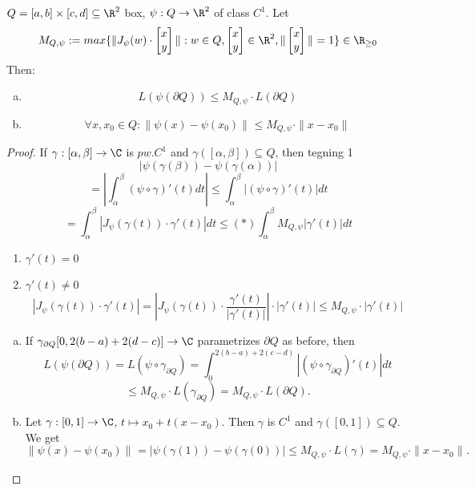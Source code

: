 \begin{lemma}
  $Q=[a,b]\times [c,d]\subseteq \R^2$ box, $\psi:Q\to\R^2$ of class $C^1$. Let
  $$M_{Q,\psi}:=max\{ \| J_{\psi}(w) \cdot
\begin{bmatrix}
  x\\
  y
\end{bmatrix}
  \|_{} : w\in Q,
  \begin{bmatrix}
    x\\
    y
  \end{bmatrix}\in \R^2
  , \| \begin{bmatrix}
    x\\
    y
  \end{bmatrix} \|_{} = 1\}\in \R_{\geq0}
    $$
    Then:
    \begin{enumerate}[(a)]
      \item
        $$L(\psi(\partial Q))\leq M_{Q,\psi} \cdot L(\partial Q)$$
      \item
        $$\forall x,x_0 \in Q : \| \psi(x)-\psi(x_0) \|_{}\leq M_{Q,\psi} \cdot \| x-x_0 \|_{} $$
    \end{enumerate}
\end{lemma}
\begin{proof}
  If $\gamma:[\alpha,\beta]\to \C$ is $pw.C^1$ and $\gamma([\alpha,\beta])\subseteq Q$, then
    \newline tegning 1
      $$|\psi(\gamma(\beta))-\psi(\gamma(\alpha))|$$
      $$=\left|\int_{\alpha}^{\beta}\left(\psi \circ \gamma\right)'(t)dt\right|\leq \int_{\alpha}^{\beta}|\left(\psi \circ \gamma \right)'(t)|dt$$
      $$=\int_{\alpha}^{\beta}|J_{\psi}(\gamma(t)) \cdot\gamma'(t)|dt\leq (*) \int_{\alpha}^{\beta}M_{Q,\psi}|\gamma'(t)|dt$$
      \begin{enumerate}[Case (1)]
        \item $\gamma'(t)=0$
        \item $\gamma'(t)\neq 0$
          $$\left|J_{\psi}(\gamma(t)) \cdot \gamma'(t)\right|=\left|J_{\psi} \left(\gamma(t)\right)\cdot \frac{\gamma'(t)}{|\gamma'(t)|}\right| \cdot |\gamma'(t)|\leq M_{Q,\psi} \cdot |\gamma'(t)|$$
      \end{enumerate}
      \begin{enumerate}[(a)]
        \item If $\gamma_{\partial Q}[0,2(b-a)+2(d-c)]\to \C$ parametrizes $\partial Q$ as before, then     $$L(\psi(\partial Q))=L(\psi \circ \gamma_{\partial Q})=\int_{0}^{2(b-a)+2(c-d)}|(\psi\circ \gamma_{\partial Q})'(t)|dt$$
          $$\leq M_{Q,\psi} \cdot L(\gamma_{\partial Q})=M_{Q,\psi} \cdot L(\partial Q).$$
        \item Let $\gamma:[0,1]\to \C$, $t\mapsto x_0+t(x-x_0)$. Then $\gamma$ is $C^1$ and $\gamma([0,1])\subseteq Q$. We get
          $$\| \psi(x)-\psi(x_0) \|_{}=|\psi(\gamma(1))-\psi(\gamma(0))|\leq M_{Q,\psi} \cdot L(\gamma)=M_{Q,\psi} \cdot \| x-x_0 \|_{}. $$
      \end{enumerate}
\end{proof}
